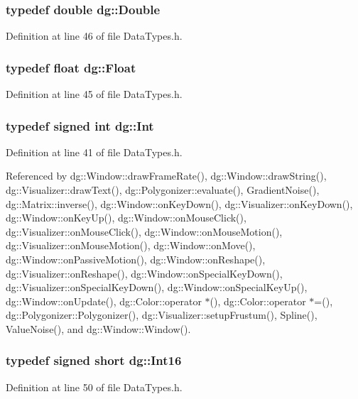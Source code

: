 \subsubsection{\setlength{\rightskip}{0pt plus 5cm}typedef double dg::Double}\label{namespacedg_a19}




Definition at line 46 of file Data\-Types.h.
\subsubsection{\setlength{\rightskip}{0pt plus 5cm}typedef float dg::Float}\label{namespacedg_a18}




Definition at line 45 of file Data\-Types.h.
\subsubsection{\setlength{\rightskip}{0pt plus 5cm}typedef signed int dg::Int}\label{namespacedg_a14}




Definition at line 41 of file Data\-Types.h.

Referenced by dg::Window::draw\-Frame\-Rate(), dg::Window::draw\-String(), dg::Visualizer::draw\-Text(), dg::Polygonizer::evaluate(), Gradient\-Noise(), dg::Matrix::inverse(), dg::Window::on\-Key\-Down(), dg::Visualizer::on\-Key\-Down(), dg::Window::on\-Key\-Up(), dg::Window::on\-Mouse\-Click(), dg::Visualizer::on\-Mouse\-Click(), dg::Window::on\-Mouse\-Motion(), dg::Visualizer::on\-Mouse\-Motion(), dg::Window::on\-Move(), dg::Window::on\-Passive\-Motion(), dg::Window::on\-Reshape(), dg::Visualizer::on\-Reshape(), dg::Window::on\-Special\-Key\-Down(), dg::Visualizer::on\-Special\-Key\-Down(), dg::Window::on\-Special\-Key\-Up(), dg::Window::on\-Update(), dg::Color::operator $\ast$(), dg::Color::operator $\ast$=(), dg::Polygonizer::Polygonizer(), dg::Visualizer::setup\-Frustum(), Spline(), Value\-Noise(), and dg::Window::Window().
\subsubsection{\setlength{\rightskip}{0pt plus 5cm}typedef signed short dg::Int16}\label{namespacedg_a21}




Definition at line 50 of file Data\-Types.h.
